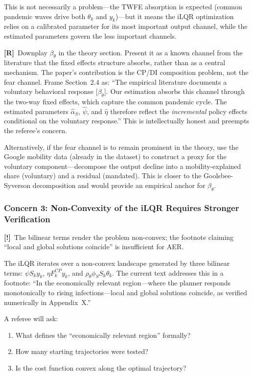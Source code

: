 \documentclass[12pt, a4paper]{article}
\newcommand{\concern}[1]{\textcolor{concern}{\textbf{[!]}~#1}}
\newcommand{\recommend}[1]{\textcolor{recommend}{\textbf{[R]}~#1}}
\begin{document}
This is not necessarily a problem---the TWFE absorption is expected (common pandemic waves drive both $\theta_k$ and $y_k$)---but it means the iLQR optimization relies on a calibrated parameter for its most important output channel, while the estimated parameters govern the less important channels.

\recommend{Downplay $\beta_\theta$ in the theory section.} Present it as a known channel from the literature that the fixed effects structure absorbs, rather than as a central mechanism. The paper's contribution is the CP/DI composition problem, not the fear channel. Frame Section~2.4 as: ``The empirical literature documents a voluntary behavioral response [$\beta_\theta$]. Our estimation absorbs this channel through the two-way fixed effects, which capture the common pandemic cycle. The estimated parameters $\hat{\alpha}_S$, $\hat{\psi}$, and $\hat{\eta}$ therefore reflect the \textit{incremental} policy effects conditional on the voluntary response.'' This is intellectually honest and preempts the referee's concern.

Alternatively, if the fear channel is to remain prominent in the theory, use the Google mobility data (already in the dataset) to construct a proxy for the voluntary component---decompose the output decline into a mobility-explained share (voluntary) and a residual (mandated). This is closer to the Goolsbee-Syverson decomposition and would provide an empirical anchor for $\beta_\theta$.


\subsubsection*{Concern 3: Non-Convexity of the iLQR Requires Stronger Verification}

\concern{The bilinear terms render the problem non-convex; the footnote claiming ``local and global solutions coincide'' is insufficient for AER.}

The iLQR iterates over a non-convex landscape generated by three bilinear terms: $\psi S_k y_k$, $\eta F_k^{CP} y_k$, and $\rho_\theta \phi_S S_k \theta_k$. The current text addresses this in a footnote: ``In the economically relevant region---where the planner responds monotonically to rising infections---local and global solutions coincide, as verified numerically in Appendix~X.''

A referee will ask:
\begin{enumerate}
    \item What defines the ``economically relevant region'' formally?
    \item How many starting trajectories were tested?
    \item Is the cost function convex along the optimal trajectory?
\end{enumerate}
\end{document}
